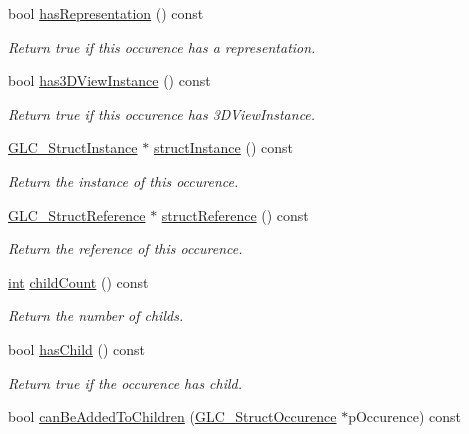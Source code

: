 \begin{DoxyCompactItemize}
bool \hyperlink{class_g_l_c___struct_occurence_af3261307ccf035ac0914e50a95c68bd4}{has\-Representation} () const 
\begin{DoxyCompactList}\small\item\em Return true if this occurence has a representation. \end{DoxyCompactList}\item 
bool \hyperlink{class_g_l_c___struct_occurence_ac99c73a3e60b6cd6b7f7963385123ded}{has3\-D\-View\-Instance} () const 
\begin{DoxyCompactList}\small\item\em Return true if this occurence has 3\-D\-View\-Instance. \end{DoxyCompactList}\item 
\hyperlink{class_g_l_c___struct_instance}{G\-L\-C\-\_\-\-Struct\-Instance} $\ast$ \hyperlink{class_g_l_c___struct_occurence_a930309eab5aa24ac12aedfbd6fb5f28e}{struct\-Instance} () const 
\begin{DoxyCompactList}\small\item\em Return the instance of this occurence. \end{DoxyCompactList}\item 
\hyperlink{class_g_l_c___struct_reference}{G\-L\-C\-\_\-\-Struct\-Reference} $\ast$ \hyperlink{class_g_l_c___struct_occurence_af41fa3dbb2fbdd91ed1dd27a324ce039}{struct\-Reference} () const 
\begin{DoxyCompactList}\small\item\em Return the reference of this occurence. \end{DoxyCompactList}\item 
\hyperlink{ioapi_8h_a787fa3cf048117ba7123753c1e74fcd6}{int} \hyperlink{class_g_l_c___struct_occurence_a823440bb8dbe42633f6d897d63861460}{child\-Count} () const 
\begin{DoxyCompactList}\small\item\em Return the number of childs. \end{DoxyCompactList}\item 
bool \hyperlink{class_g_l_c___struct_occurence_a25434c003f068bff6dc115ac0f263b8e}{has\-Child} () const 
\begin{DoxyCompactList}\small\item\em Return true if the occurence has child. \end{DoxyCompactList}\item 
bool \hyperlink{class_g_l_c___struct_occurence_aabf514513c7a74668c188487f4e620b3}{can\-Be\-Added\-To\-Children} (\hyperlink{class_g_l_c___struct_occurence}{G\-L\-C\-\_\-\-Struct\-Occurence} $\ast$p\-Occurence) const 

\end{DoxyCompactItemize}
